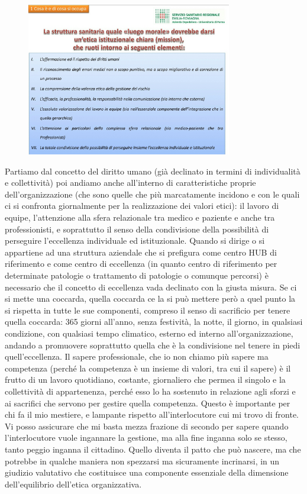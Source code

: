  \begin{figure}[!ht]
\centering
	\includegraphics[width=0.8\textwidth]{32/image6.jpeg}
	\end{figure}

Partiamo dal concetto del diritto umano (già declinato in termini di
individualità e collettività) poi andiamo anche all'interno di
caratteristiche proprie dell'organizzazione (che sono quelle che più
marcatamente incidono e con le quali ci si confronta giornalmente per la
realizzazione dei valori etici): il lavoro di equipe, l'attenzione alla
sfera relazionale tra medico e paziente e anche tra professionisti, e
soprattutto il senso della condivisione della possibilità di perseguire
l'eccellenza individuale ed istituzionale. Quando si dirige o si
appartiene ad una struttura aziendale che si prefigura come centro HUB
di riferimento e come centro di eccellenza (in quanto centro di
riferimento per determinate patologie o trattamento di patologie o
comunque percorsi) è necessario che il concetto di eccellenza vada
declinato con la giusta misura. Se ci si mette una coccarda, quella
coccarda ce la si può mettere però a quel punto la si rispetta in tutte
le sue componenti, compreso il senso di sacrificio per tenere quella
coccarda: 365 giorni all'anno, senza festività, la notte, il giorno, in
qualsiasi condizione, con qualsiasi tempo climatico, esterno ed interno
all'organizzazione, andando a promuovere soprattutto quella che è la
condivisione nel tenere in piedi quell'eccellenza. Il sapere
professionale, che io non chiamo più sapere ma competenza (perché la
competenza è un insieme di valori, tra cui il sapere) è il frutto di un
lavoro quotidiano, costante, giornaliero che permea il singolo e la
collettività di appartenenza, perché esso lo ha sostenuto in relazione
agli sforzi e ai sacrifici che servono per gestire quella competenza.
Questo è importante per chi fa il mio mestiere, e lampante rispetto
all'interlocutore cui mi trovo di fronte. Vi posso assicurare che mi
basta mezza frazione di secondo per sapere quando l'interlocutore vuole
ingannare la gestione, ma alla fine inganna solo se stesso, tanto peggio
inganna il cittadino. Quello diventa il patto che può nascere, ma che
potrebbe in qualche maniera non spezzarsi ma sicuramente incrinarsi, in
un giudizio valutativo che costituisce una componente essenziale della
dimensione dell'equilibrio dell'etica organizzativa.


